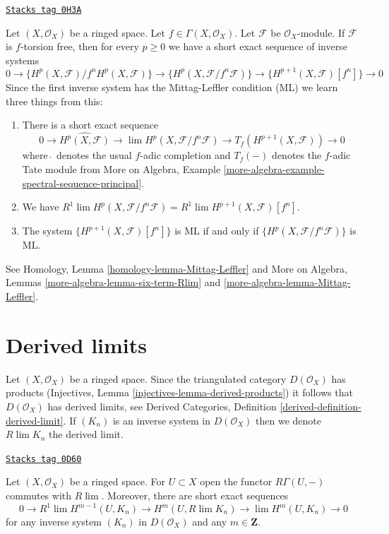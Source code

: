 \begin{remark}[Compare ML]
\label{cohomology-remark-compare-ML}
\href{https://stacks.math.columbia.edu/tag/0H3A}{\texttt{Stacks tag 0H3A}}

Let $(X, \mathcal{O}_X)$ be a ringed space.
Let $f \in \Gamma(X, \mathcal{O}_X)$.
Let $\mathcal{F}$ be $\mathcal{O}_X$-module.
If $\mathcal{F}$ is $f$-torsion free, then for every $p \geq 0$
we have a short exact sequence of inverse systems
$$
0 \to \{H^p(X, \mathcal{F})/f^nH^p(X, \mathcal{F})\}
\to \{H^p(X, \mathcal{F}/f^n\mathcal{F})\}
\to \{H^{p + 1}(X, \mathcal{F})[f^n]\} \to 0
$$
Since the first inverse system has the Mittag-Leffler condition (ML)
we learn three things from this:
\begin{enumerate}
\item There is a short exact sequence
$$
0 \to \widehat{H^p(X, \mathcal{F})} \to
\lim H^p(X, \mathcal{F}/f^n\mathcal{F}) \to
T_f(H^{p + 1}(X, \mathcal{F})) \to 0
$$
where $\widehat{\ }$ denotes the usual $f$-adic completion and
$T_f( - )$ denotes the $f$-adic Tate module from
More on Algebra, Example
\ref{more-algebra-example-spectral-sequence-principal}.
\item We have
$R^1\lim H^p(X, \mathcal{F}/f^n\mathcal{F}) =
R^1\lim H^{p + 1}(X, \mathcal{F})[f^n]$.
\item The system $\{H^{p + 1}(X, \mathcal{F})[f^n]\}$ is ML if and only if
$\{H^p(X, \mathcal{F}/f^n\mathcal{F})\}$ is ML.
\end{enumerate}
See Homology, Lemma \ref{homology-lemma-Mittag-Leffler} and
More on Algebra, Lemmas \ref{more-algebra-lemma-six-term-Rlim} and
\ref{more-algebra-lemma-Mittag-Leffler}.
\end{remark}

\section{Derived limits}
\label{cohomology-section-derived-limits}
Let $(X, \mathcal{O}_X)$ be a ringed space. Since the triangulated category
$D(\mathcal{O}_X)$ has products
(Injectives, Lemma \ref{injectives-lemma-derived-products})
it follows that $D(\mathcal{O}_X)$ has derived limits, see
Derived Categories, Definition \ref{derived-definition-derived-limit}.
If $(K_n)$ is an inverse system in $D(\mathcal{O}_X)$ then we
denote $R\lim K_n$ the derived limit.

\begin{lemma}
\label{cohomology-lemma-RGamma-commutes-with-Rlim}
\href{https://stacks.math.columbia.edu/tag/0D60}{\texttt{Stacks tag 0D60}}

Let $(X, \mathcal{O}_X)$ be a ringed space. For $U \subset X$ open the
functor $R\Gamma(U, -)$ commutes with $R\lim$. Moreover, there are
short exact sequences
$$
0 \to
R^1\lim H^{m - 1}(U, K_n) \to H^m(U, R\lim K_n) \to
\lim H^m(U, K_n) \to 0
$$
for any inverse system $(K_n)$ in $D(\mathcal{O}_X)$ and any $m \in \mathbf{Z}$.
\end{lemma}

